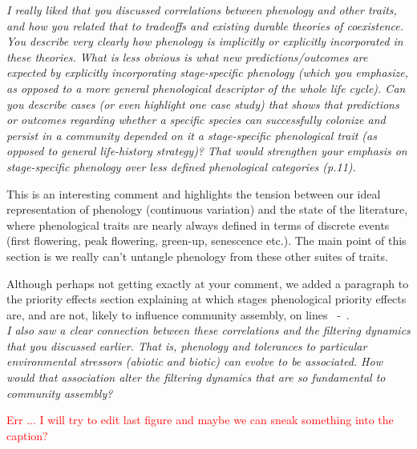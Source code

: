 \documentclass[11pt]{article}
\newcommand{\lr}[1]{~\lineref{#1}}
\begin{document}
\emph{I really liked that you discussed correlations between phenology and other traits, and how you related that to tradeoffs and existing durable theories of coexistence. You describe very clearly how phenology is implicitly or explicitly incorporated in these theories. What is less obvious is what new predictions/outcomes are expected by explicitly incorporating stage-specific phenology (which you emphasize, as opposed to a more general phenological descriptor of the whole life cycle). Can you describe cases (or even highlight one case study) that shows that predictions or outcomes regarding whether a specific species can successfully colonize and persist in a community depended on it a stage-specific phenological trait (as opposed to general life-history strategy)? That would strengthen your emphasis on stage-specific phenology over less defined phenological categories (p.11).}

This is an interesting comment and highlights the tension between our ideal representation of phenology (continuous variation) and the state of the literature, where phenological traits are nearly always defined in terms of discrete events (first flowering, peak flowering, green-up, senescence etc.). The main point of this section is we really can't untangle phenology from these other suites of traits. 

Although perhaps not getting exactly at your comment, we added a paragraph to the priority effects section explaining at which stages phenological priority effects are, and are not, likely to influence community assembly, on lines\lr{stage1} -\lr{stage2}.\\ %

\emph{I also saw a clear connection between these correlations and the filtering dynamics that you discussed earlier. That is, phenology and tolerances to particular environmental stressors (abiotic and biotic) can evolve to be associated. How would that association alter the filtering dynamics that are so fundamental to community assembly?}

\textcolor{red}{Err ... I will try to edit last figure and maybe we can sneak something into the caption?}\\
\end{document}
